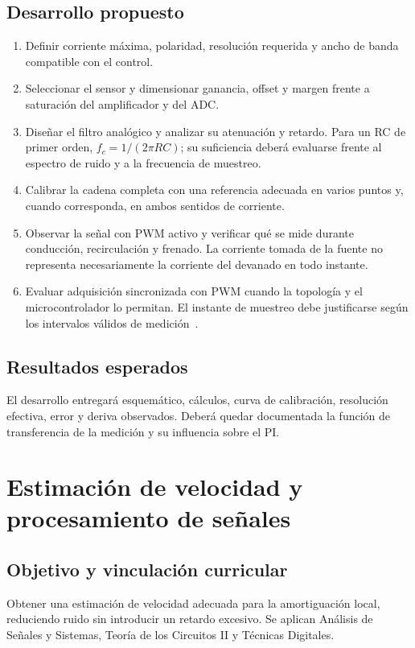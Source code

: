 \documentclass[11pt,a4paper]{article}
\begin{document}
\subsection{Desarrollo propuesto}
\begin{enumerate}
    \item Definir corriente máxima, polaridad, resolución requerida y
    ancho de banda compatible con el control.
    \item Seleccionar el sensor y dimensionar ganancia, offset y margen
    frente a saturación del amplificador y del ADC.
    \item Diseñar el filtro analógico y analizar su atenuación y retardo.
    Para un RC de primer orden, $f_c=1/(2\pi RC)$; su suficiencia deberá
    evaluarse frente al espectro de ruido y a la frecuencia de muestreo.
    \item Calibrar la cadena completa con una referencia adecuada en
    varios puntos y, cuando corresponda, en ambos sentidos de corriente.
    \item Observar la señal con PWM activo y verificar qué se mide durante
    conducción, recirculación y frenado. La corriente tomada de la fuente
    no representa necesariamente la corriente del devanado en todo instante.
    \item Evaluar adquisición sincronizada con PWM cuando la topología y
    el microcontrolador lo permitan. El instante de muestreo debe justificarse
    según los intervalos válidos de medición~\cite{microchipSync}.
\end{enumerate}

\subsection{Resultados esperados}
El desarrollo entregará esquemático, cálculos, curva de calibración,
resolución efectiva, error y deriva observados. Deberá quedar documentada
la función de transferencia de la medición y su influencia sobre el PI.

\section{Estimación de velocidad y procesamiento de señales}

\subsection{Objetivo y vinculación curricular}
Obtener una estimación de velocidad adecuada para la amortiguación local,
reduciendo ruido sin introducir un retardo excesivo. Se aplican Análisis de
Señales y Sistemas, Teoría de los Circuitos II y Técnicas Digitales.
\end{document}
